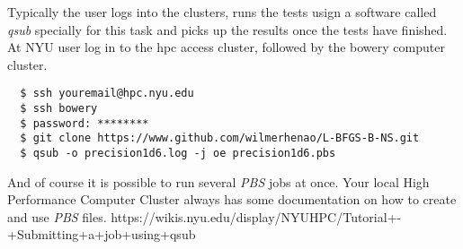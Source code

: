 Typically the user logs into the clusters, runs the tests usign a software called \emph{qsub} specially for this task and picks up the results once the tests have finished. At NYU user log in to the hpc access cluster, followed by the bowery computer cluster.

\begin{lstlisting}
  $ ssh youremail@hpc.nyu.edu
  $ ssh bowery
  $ password: ********
  $ git clone https://www.github.com/wilmerhenao/L-BFGS-B-NS.git
  $ qsub -o precision1d6.log -j oe precision1d6.pbs
\end{lstlisting}

And of course it is possible to run several \emph{PBS} jobs at once. Your local High Performance Computer Cluster always has some documentation on how to create and use \emph{PBS} files. https://wikis.nyu.edu/display/NYUHPC/Tutorial+-+Submitting+a+job+using+qsub
